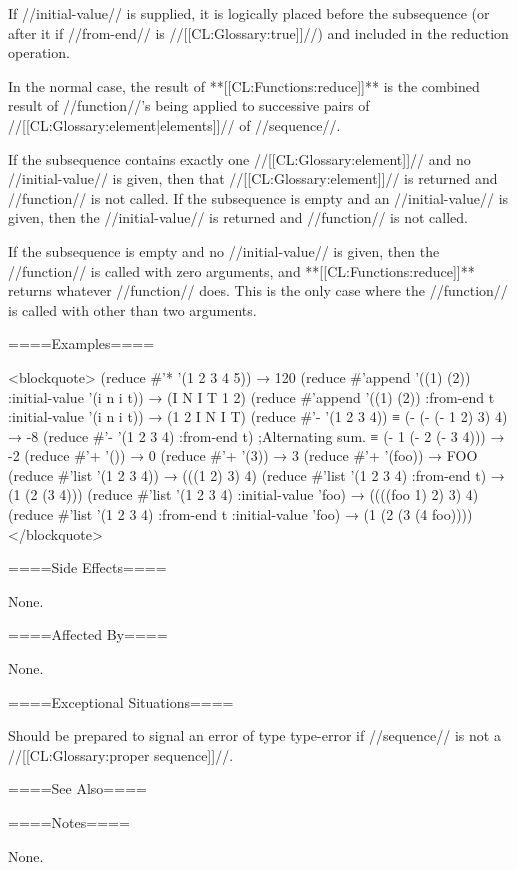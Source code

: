 If //initial-value// is supplied, it is logically placed before the subsequence (or after it if //from-end// is //[[CL:Glossary:true]]//) and included in the reduction operation.

In the normal case, the result of **[[CL:Functions:reduce]]** is the combined result of //function//'s being applied to successive pairs of //[[CL:Glossary:element|elements]]// of //sequence//.

If the subsequence contains exactly one //[[CL:Glossary:element]]// and no //initial-value// is given, then that //[[CL:Glossary:element]]// is returned and //function// is not called. If the subsequence is empty and an //initial-value// is given, then the //initial-value// is returned and //function// is not called.

If the subsequence is empty and no //initial-value// is given, then the //function// is called with zero arguments, and **[[CL:Functions:reduce]]** returns whatever //function// does. This is the only case where the //function// is called with other than two arguments.

====Examples====

<blockquote> (reduce #'* '(1 2 3 4 5)) → 120 (reduce #'append '((1) (2)) :initial-value '(i n i t)) → (I N I T 1 2) (reduce #'append '((1) (2)) :from-end t :initial-value '(i n i t)) → (1 2 I N I T) (reduce #'- '(1 2 3 4)) ≡ (- (- (- 1 2) 3) 4) → -8 (reduce #'- '(1 2 3 4) :from-end t) ;Alternating sum. ≡ (- 1 (- 2 (- 3 4))) → -2 (reduce #'+ '()) → 0 (reduce #'+ '(3)) → 3 (reduce #'+ '(foo)) → FOO (reduce #'list '(1 2 3 4)) → (((1 2) 3) 4) (reduce #'list '(1 2 3 4) :from-end t) → (1 (2 (3 4))) (reduce #'list '(1 2 3 4) :initial-value 'foo) → ((((foo 1) 2) 3) 4) (reduce #'list '(1 2 3 4) :from-end t :initial-value 'foo) → (1 (2 (3 (4 foo)))) </blockquote>

====Side Effects====

None.

====Affected By====

None.

====Exceptional Situations====

Should be prepared to signal an error of type type-error if //sequence// is not a //[[CL:Glossary:proper sequence]]//.

====See Also====

{\secref\TraversalRules}

====Notes====

None.


    
